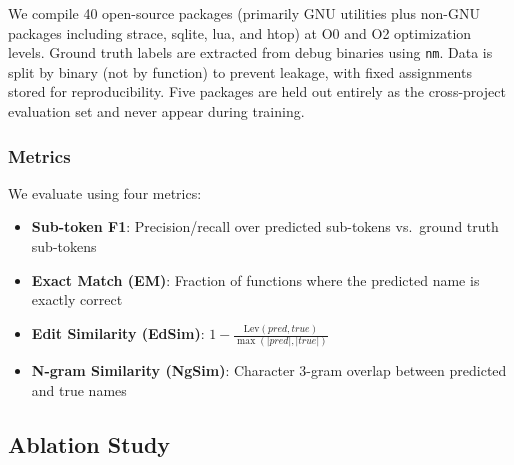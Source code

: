 \documentclass[sigconf,nonacm]{acmart}
\begin{document}
We compile 40 open-source packages (primarily GNU utilities plus non-GNU packages including strace, sqlite, lua, and htop) at O0 and O2 optimization levels. Ground truth labels are extracted from debug binaries using \texttt{nm}. Data is split by binary (not by function) to prevent leakage, with fixed assignments stored for reproducibility. Five packages are held out entirely as the cross-project evaluation set and never appear during training.

\subsubsection{Metrics}
We evaluate using four metrics:
\begin{itemize}
    \item \textbf{Sub-token F1}: Precision/recall over predicted sub-tokens vs.\ ground truth sub-tokens
    \item \textbf{Exact Match (EM)}: Fraction of functions where the predicted name is exactly correct
    \item \textbf{Edit Similarity (EdSim)}: $1 - \frac{\text{Lev}(pred, true)}{\max(|pred|, |true|)}$
    \item \textbf{N-gram Similarity (NgSim)}: Character 3-gram overlap between predicted and true names
\end{itemize}

\subsection{Ablation Study}
\label{sec:ablation}

\begin{table}[t]
    \centering
    \caption{Ablation study. All models trained on the same 87K-function dataset. Cross-project EM is evaluated on 2,256 functions from 5 unseen packages.}
    \label{tab:ablation}
\end{table}
\end{document}
